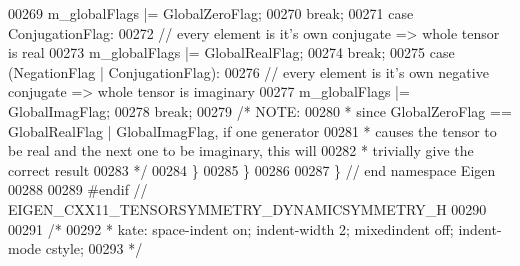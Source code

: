 \begin{DoxyCode}
00269         m\_globalFlags |= GlobalZeroFlag;
00270         \textcolor{keywordflow}{break};
00271       \textcolor{keywordflow}{case} ConjugationFlag:
00272         \textcolor{comment}{// every element is it's own conjugate => whole tensor is real}
00273         m\_globalFlags |= GlobalRealFlag;
00274         \textcolor{keywordflow}{break};
00275       \textcolor{keywordflow}{case} (NegationFlag | ConjugationFlag):
00276         \textcolor{comment}{// every element is it's own negative conjugate => whole tensor is imaginary}
00277         m\_globalFlags |= GlobalImagFlag;
00278         \textcolor{keywordflow}{break};
00279       \textcolor{comment}{/* NOTE:}
00280 \textcolor{comment}{       *   since GlobalZeroFlag == GlobalRealFlag | GlobalImagFlag, if one generator}
00281 \textcolor{comment}{       *   causes the tensor to be real and the next one to be imaginary, this will}
00282 \textcolor{comment}{       *   trivially give the correct result}
00283 \textcolor{comment}{       */}
00284     \}
00285 \}
00286 
00287 \} \textcolor{comment}{// end namespace Eigen}
00288 
00289 \textcolor{preprocessor}{#endif // EIGEN\_CXX11\_TENSORSYMMETRY\_DYNAMICSYMMETRY\_H}
00290 
00291 \textcolor{comment}{/*}
00292 \textcolor{comment}{ * kate: space-indent on; indent-width 2; mixedindent off; indent-mode cstyle;}
00293 \textcolor{comment}{ */}
\end{DoxyCode}
